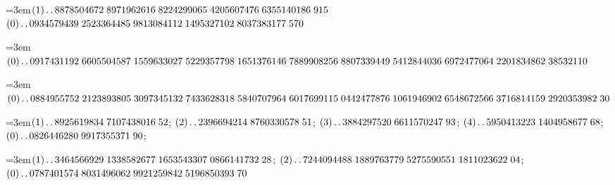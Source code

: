 %
\begingroup\raggedright
\par\noindent\hangindent=3em\enspace $(1)\mathinner{.\,.}8878504672\;\allowbreak 8971962616\;\allowbreak 8224299065\;\allowbreak 4205607476\;\allowbreak 6355140186\;\allowbreak 915$ $(0)\mathinner{.\,.}0934579439\;\allowbreak 2523364485\;\allowbreak 9813084112\;\allowbreak 1495327102\;\allowbreak 8037383177\;\allowbreak 570$\par\smallskip

\par\noindent\hangindent=3em\enspace $(0)\mathinner{.\,.}0917431192\;\allowbreak 6605504587\;\allowbreak 1559633027\;\allowbreak 5229357798\;\allowbreak 1651376146\;\allowbreak 7889908256\;\allowbreak 8807339449\;\allowbreak 5412844036\;\allowbreak 6972477064\;\allowbreak 2201834862\;\allowbreak 38532110$\par\smallskip

\par\noindent\hangindent=3em\enspace $(0)\mathinner{.\,.}0884955752\;\allowbreak 2123893805\;\allowbreak 3097345132\;\allowbreak 7433628318\;\allowbreak 5840707964\;\allowbreak 6017699115\;\allowbreak 0442477876\;\allowbreak 1061946902\;\allowbreak 6548672566\;\allowbreak 3716814159\;\allowbreak 2920353982\;\allowbreak 30$\par\smallskip

\par\noindent\hangindent=3em\enspace $(1)\mathinner{.\,.}8925619834\;\allowbreak 7107438016\;\allowbreak 52$; $(2)\mathinner{.\,.}2396694214\;\allowbreak 8760330578\;\allowbreak 51$; $(3)\mathinner{.\,.}3884297520\;\allowbreak 6611570247\;\allowbreak 93$; $(4)\mathinner{.\,.}5950413223\;\allowbreak 1404958677\;\allowbreak 68$; $(0)\mathinner{.\,.}0826446280\;\allowbreak 9917355371\;\allowbreak 90$;\par\smallskip

\par\noindent\hangindent=3em\enspace $(1)\mathinner{.\,.}3464566929\;\allowbreak 1338582677\;\allowbreak 1653543307\;\allowbreak 0866141732\;\allowbreak 28$; $(2)\mathinner{.\,.}7244094488\;\allowbreak 1889763779\;\allowbreak 5275590551\;\allowbreak 1811023622\;\allowbreak 04$; $(0)\mathinner{.\,.}0787401574\;\allowbreak 8031496062\;\allowbreak 9921259842\;\allowbreak 5196850393\;\allowbreak 70$\par\smallskip


